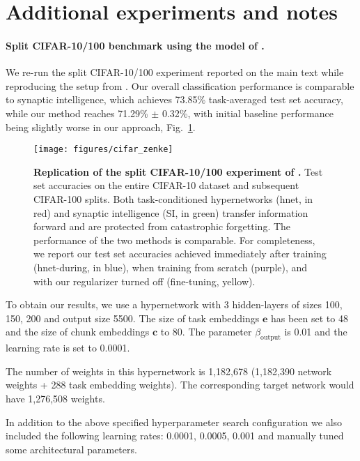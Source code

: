 \documentclass{article}
\begin{document}
\section{Additional experiments and notes}
\label{apx:extra-experiments}

\paragraph{Split CIFAR-10/100 benchmark using the model of \citet{zenke_continual_2017}.} We re-run the split CIFAR-10/100 experiment reported on the main text while reproducing the setup from \citet{zenke_continual_2017}. Our overall classification performance is comparable to synaptic intelligence, which achieves 73.85\% task-averaged test set accuracy, while our method reaches 71.29\% $\pm$ 0.32\%, with initial baseline performance being slightly worse in our approach, Fig.~\ref{fig:cifar-zenke}.

\begin{figure}[htbp]
    \centering
    \texttt{[image: figures/cifar\_zenke]}
    \caption{\textbf{Replication of the split CIFAR-10/100 experiment of \citet{zenke_continual_2017}.} Test set accuracies on the entire CIFAR-10 dataset and subsequent CIFAR-100 splits. Both task-conditioned hypernetworks (hnet, in red) and synaptic intelligence (SI, in green) transfer information forward and are protected from catastrophic forgetting. The performance of the two methods is comparable. For completeness, we report our test set accuracies achieved immediately after training (hnet-during, in blue), when training from scratch (purple), and with our regularizer turned off (fine-tuning, yellow). \label{fig:cifar-zenke}}
\end{figure}

To obtain our results, we use a hypernetwork with 3 hidden-layers of sizes 100, 150, 200 and output size 5500. The size of task embeddings $\mathbf{e}$ has been set to 48 and the size of chunk embeddings $\mathbf{c}$ to 80. The parameter $\beta_\text{output}$ is 0.01 and the learning rate is set to 0.0001.

The number of weights in this hypernetwork is 1,182,678 (1,182,390 network weights + 288 task embedding weights). The corresponding target network would have 1,276,508 weights.

In addition to the above specified hyperparameter search configuration we also included the following learning rates: 0.0001, 0.0005, 0.001 and manually tuned some architectural parameters.
\end{document}
